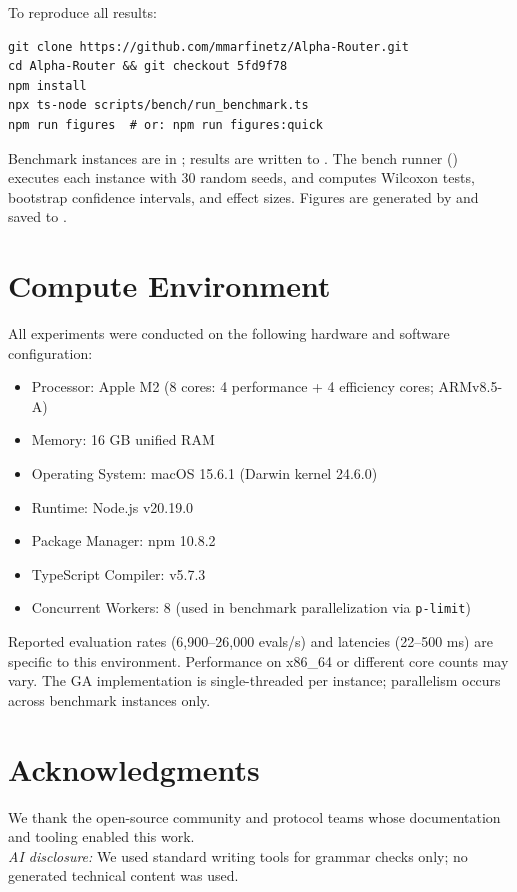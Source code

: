 \documentclass[11pt]{article}
\newcommand{\1}{\mathbf{1}}  %
\begin{document}
To reproduce all results:
\begin{verbatim}
git clone https://github.com/mmarfinetz/Alpha-Router.git
cd Alpha-Router && git checkout 5fd9f78
npm install
npx ts-node scripts/bench/run_benchmark.ts
npm run figures  # or: npm run figures:quick
\end{verbatim}

Benchmark instances are in ; results are written to . The bench runner () executes each instance with 30 random seeds, and  computes Wilcoxon tests, bootstrap confidence intervals, and effect sizes. Figures are generated by  and saved to .

\section*{Compute Environment}
All experiments were conducted on the following hardware and software configuration:
\begin{itemize}[leftmargin=*,nosep]
  \item Processor: Apple M2 (8 cores: 4 performance + 4 efficiency cores; ARMv8.5-A)
  \item Memory: 16 GB unified RAM
  \item Operating System: macOS 15.6.1 (Darwin kernel 24.6.0)
  \item Runtime: Node.js v20.19.0
  \item Package Manager: npm 10.8.2
  \item TypeScript Compiler: v5.7.3
  \item Concurrent Workers: 8 (used in benchmark parallelization via \texttt{p-limit})
\end{itemize}

Reported evaluation rates (6{,}900--26{,}000 evals/s) and latencies (22--500 ms) are specific to this environment. Performance on x86\_64 or different core counts may vary. The GA implementation is single-threaded per instance; parallelism occurs across benchmark instances only.

\section*{Acknowledgments}
We thank the open-source community and protocol teams whose documentation and tooling enabled this work.\\
\textit{AI disclosure:} We used standard writing tools for grammar checks only; no generated technical content was used.
\end{document}
